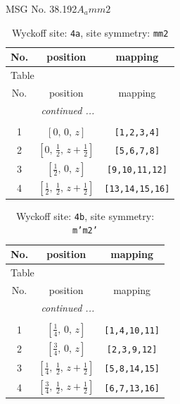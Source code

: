 \documentclass[fleqn,8pt]{jsarticle}
\begin{document}
\setcounter{MaxMatrixCols}{32}

\renewcommand{\tablename}{Table~}
\renewcommand{\figurename}{Figure~}
\begin{center}
\LARGE
MSG No. 38.192\quad$A_{a}mm2$
\end{center}
\renewcommand{\arraystretch}{1.2}
\begin{longtable}{ccc}
\caption{Wyckoff site: {\tt 4a}, site symmetry: {\tt mm2}}
 \\
 \hline \hline
No. & position & mapping \\ \hline \endfirsthead

\multicolumn{2}{l}{\tablename\ \thetable{}} \\
 \hline \hline
No. & position & mapping \\ \hline \endhead

 \hline \hline
\multicolumn{2}{r}{\footnotesize\it continued ...} \\ \endfoot

 \hline \hline
\multicolumn{2}{r}{} \\ \endlastfoot

1 & $\left[ 0,\, 0,\, z \right]$ & {\tt [1,2,3,4]} \\ \hline
2 & $\left[ 0,\, \frac{1}{2},\, z + \frac{1}{2} \right]$ & {\tt [5,6,7,8]} \\ \hline
3 & $\left[ \frac{1}{2},\, 0,\, z \right]$ & {\tt [9,10,11,12]} \\ \hline
4 & $\left[ \frac{1}{2},\, \frac{1}{2},\, z + \frac{1}{2} \right]$ & {\tt [13,14,15,16]} \\
\end{longtable}
\renewcommand{\arraystretch}{1.2}
\begin{longtable}{ccc}
\caption{Wyckoff site: {\tt 4b}, site symmetry: {\tt m'm2'}}
 \\
 \hline \hline
No. & position & mapping \\ \hline \endfirsthead

\multicolumn{2}{l}{\tablename\ \thetable{}} \\
 \hline \hline
No. & position & mapping \\ \hline \endhead

 \hline \hline
\multicolumn{2}{r}{\footnotesize\it continued ...} \\ \endfoot

 \hline \hline
\multicolumn{2}{r}{} \\ \endlastfoot

1 & $\left[ \frac{1}{4},\, 0,\, z \right]$ & {\tt [1,4,10,11]} \\ \hline
2 & $\left[ \frac{3}{4},\, 0,\, z \right]$ & {\tt [2,3,9,12]} \\ \hline
3 & $\left[ \frac{1}{4},\, \frac{1}{2},\, z + \frac{1}{2} \right]$ & {\tt [5,8,14,15]} \\ \hline
4 & $\left[ \frac{3}{4},\, \frac{1}{2},\, z + \frac{1}{2} \right]$ & {\tt [6,7,13,16]} \\
\end{longtable}
\end{document}
